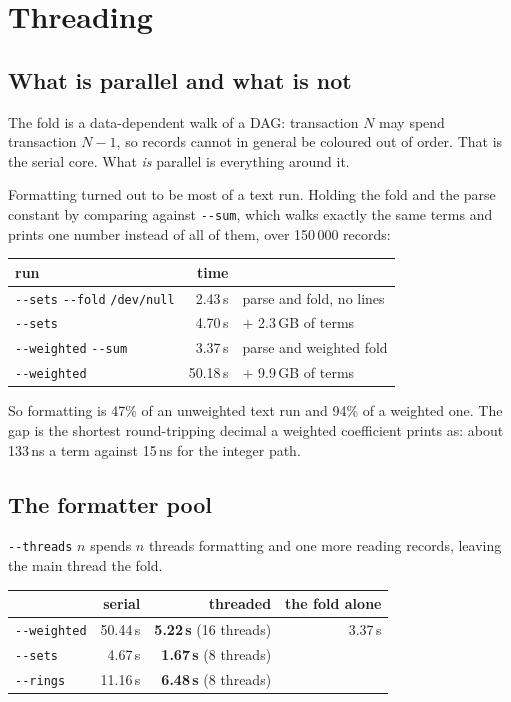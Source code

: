 \documentclass[11pt,a4paper]{article}
\newcommand{\flag}[1]{\texttt{-{}-#1}}
\begin{document}
\section{Threading}
\label{sec:threading}

\subsection{What is parallel and what is not}

The fold is a data-dependent walk of a DAG: transaction $N$ may spend
transaction $N-1$, so records cannot in general be coloured out of order. That
is the serial core. What \emph{is} parallel is everything around it.

Formatting turned out to be most of a text run. Holding the fold and the parse
constant by comparing against \flag{sum}, which walks exactly the same terms and
prints one number instead of all of them, over 150\,000 records:

\begin{center}
\begin{tabular}{lrl}
\toprule
run & time & \\
\midrule
\flag{sets} \flag{fold} \texttt{/dev/null} & 2.43\,s & parse and fold, no lines \\
\flag{sets}                                & 4.70\,s & $+$ 2.3\,GB of terms \\
\flag{weighted} \flag{sum}                 & 3.37\,s & parse and weighted fold \\
\flag{weighted}                            & 50.18\,s & $+$ 9.9\,GB of terms \\
\bottomrule
\end{tabular}
\end{center}

So formatting is 47\% of an unweighted text run and 94\% of a weighted one. The
gap is the shortest round-tripping decimal a weighted coefficient prints as:
about 133\,ns a term against 15\,ns for the integer path.

\subsection{The formatter pool}

\flag{threads} $n$ spends $n$ threads formatting and one more reading records,
leaving the main thread the fold.

\begin{center}
\begin{tabular}{lrrr}
\toprule
& serial & threaded & the fold alone \\
\midrule
\flag{weighted} & 50.44\,s & \textbf{5.22\,s} (16 threads) & 3.37\,s \\
\flag{sets}     & 4.67\,s  & \textbf{1.67\,s} (8 threads)  & \\
\flag{rings}    & 11.16\,s & \textbf{6.48\,s} (8 threads)  & \\
\bottomrule
\end{tabular}
\end{center}
\end{document}
